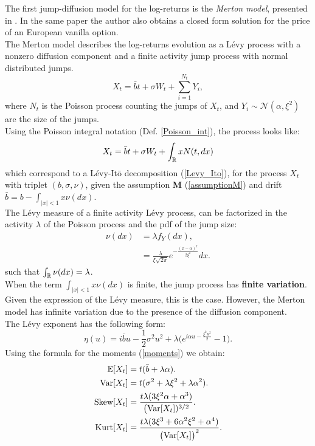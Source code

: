 The first jump-diffusion model for the log-returns is the \emph{Merton model}, presented in 
\cite{Me76}. In the same paper the author also obtains a closed form solution for the price of an European vanilla option.\\  
The Merton model describes the log-returns evolution as a Lévy process with a nonzero diffusion 
component and a finite activity jump process with normal distributed jumps.
\begin{equation}\label{MertonM}
X_t = \bar b t + \sigma W_t + \sum_{i=1}^{N_t} Y_i, 
\end{equation}
where $N_t$ is the Poisson process counting the jumps of $X_t$, and $Y_i \sim \mathcal{N}(\alpha, \xi^2)$ are the size of the jumps.\\
Using the Poisson integral notation (Def. \ref{Poisson_int}), the process looks like:
\begin{equation*}
 X_t = \bar b t + \sigma W_t + \int_{\mathbb{R}} x N(t,dx)
\end{equation*}
which correspond to a Lévy-It\={o} decomposition (\ref{Levy_Ito}), for the process $X_t$ with triplet $(b,\sigma,\nu)$, 
given the assumption \textbf{M} (\ref{assumptionM}) and drift
$\bar b = b - \int_{|x|<1} x \nu(dx)$.\\
The Lévy measure of a finite activity Lévy process, can be factorized in the activity $\lambda$ of the Poisson process and 
the pdf of the jump size:
\begin{align*}
 \nu(dx) &= \lambda f_Y(dx), \\
	 &= \frac{\lambda}{\xi \sqrt{2\pi}} e^{- \frac{(x-\alpha)^2}{2\xi^2}} dx.  
\end{align*}
such that $\int_{\mathbb{R}} \nu(dx) = \lambda$.\\
When the term $\int_{|x|<1} x \nu(dx)$ is finite, the jump process has \textbf{finite variation}. Given the expression of the 
Lévy measure, this is the case. However, 
the Merton model has infinite variation due to the presence of the diffusion component.\\ 
The Lévy exponent has the following form:
\begin{equation}
 \eta(u) = i\bar b u - \frac{1}{2} \sigma^2 u^2 + \lambda \biggl( e^{i\alpha u -\frac{\xi^2 u^2}{2} }-1 \biggr). 
\end{equation}
\newline
Using the formula for the moments (\ref{moments}) we obtain:
\begin{align}\label{Merton_moments}
 \mathbb{E}[X_t] &= t(\bar b+\lambda \alpha). \\ \nonumber
 \mbox{Var}[X_t] &= t(\sigma^2 + \lambda \xi^2 + \lambda \alpha^2). \\ \nonumber
 \mbox{Skew}[X_t] &= \frac{t\lambda (3\xi^2 \alpha + \alpha^3)}{\bigl(\mbox{Var}[X_t])^{3/2}}. \\ \nonumber
 \mbox{Kurt}[X_t] &= \frac{t \lambda (3\xi^3 +6\alpha^2\xi^2 +\alpha^4)}{\bigl(\mbox{Var}[X_t]\bigr)^2}. \nonumber
\end{align} \newline
